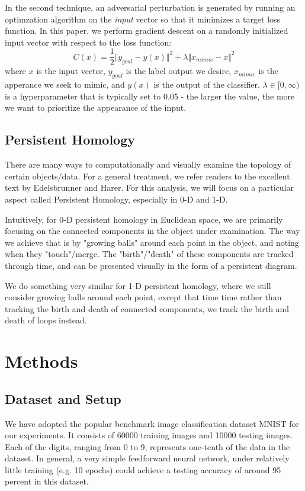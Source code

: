 \documentclass[twoside,twocolumn]{article}
\begin{document}
In the second technique, an adversarial perturbation is generated by running an optimzation algorithm on the \emph{input} vector so that it minimizes a target loss function. In this paper, we perform gradient descent on a randomly initialized input vector with respect to the loss function: 
$$
C(x) = \frac{1}{2} \Vert y_{goal} - y(x) \Vert^2
+ \lambda \Vert x_{mimic} - x \Vert^2
$$  
where $x$ is the input vector, $y_{goal}$ is the label output we desire, $x_{mimic}$ is the apperance we seek to mimic, and $y(x)$ is the output of the classifier. $\lambda \in [0,\infty)$ is a hyperparameter that is typically set to 0.05 - the larger the value, the more we want to prioritize the appearance of the input. 

\subsection{Persistent Homology}

There are many ways to computationally and visually examine the topology of certain objects/data. For a general treatment, we refer readers to the excellent text by Edelsbrunner and Harer. For this analysis, we will focus on a particular aspect called Persistent Homology, especially in 0-D and 1-D. 

Intuitively, for 0-D persistent homology in Euclidean space, we are primarily focusing on the connected components in the object under examination. The way we achieve that is by "growing balls" around each point in the object, and noting when they "touch"/merge. The "birth"/"death" of these components are tracked through time, and can be presented visually in the form of a persistent diagram. 

We do something very similar for 1-D persistent homology, where we still consider growing balls around each point, except that time time rather than tracking the birth and death of connected components, we track the birth and death of loops instead. 

\section{Methods}

\subsection{Dataset and Setup}
We have adopted the popular benchmark image classification dataset MNIST for our experiments. It consists of 60000 training images and 10000 testing images. Each of the digits, ranging from 0 to 9, represents one-tenth of the data in the dataset. In general, a very simple feedforward neural network, under relatively little training (e.g. 10 epochs) could achieve a testing accuracy of around 95 percent in this dataset. 
\end{document}
